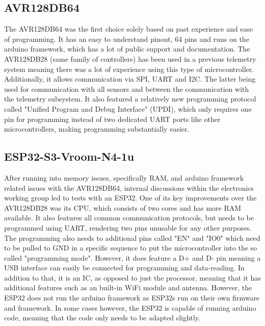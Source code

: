 \documentclass[fontsize=11pt,%
twoside,%
BCOR          = 8mm, %
DIV           = 11,  %
titlepage     = off,%
index=totoc,%
xcolor        = pdftex,%
dvipsnames,%
bibliography  = totoc,%
bibliography = numbered, %
listof        = notnumbered]{scrreprt}
\begin{document}
\subsection{AVR128DB64}
The AVR128DB64 was the first choice solely based on past experience and ease of programming. It has an easy to understand pinout, 64 pins and runs on the arduino framework, which has a lot of public support and documentation. The AVR128DB28 (same family of controllers) has been used in a previous telemetry system meaning there was a lot of experience using this type of microcontroller. Additionally, it allows communication via SPI, UART and I2C. The latter being used for communication with all sensors and between the communication with the telemetry subsystem. It also featured a relatively new programming protocol called "Unified Program and Debug Interface" (UPDI), which only requires one pin for programming instead of two dedicated UART ports like other microcontrollers, making programming substantially easier.\\

\subsection{ESP32-S3-Vroom-N4-1u}
After running into memory issues, specifically RAM, and arduino framework related issues with the AVR128DB64, internal discussions within the electronics working group led to tests with an ESP32. One of its key improvements over the AVR128DB28 was its CPU, which consists of two cores and has more RAM available. It also features all common communication protocols, but needs to be programmed using UART, rendering two pins unusable for any other purposes. The programming also needs to additional pins called "EN" and "IO0" which need to be pulled to GND in a specific sequence to put the microcontroller into the so called "programming mode". However, it does feature a D+ and D- pin meaning a USB interface can easily be connected for programming and data-reading. In addition to that, it is an IC, as opposed to just the processor, meaning that it has additional features such as an built-in WiFi module and antenna.  However, the ESP32 does not run the arduino framework as ESP32s run on their own firmware and framework. In some cases however, the ESP32 is capable of running arduino code, meaning that the code only needs to be adapted slightly.\\
\end{document}
